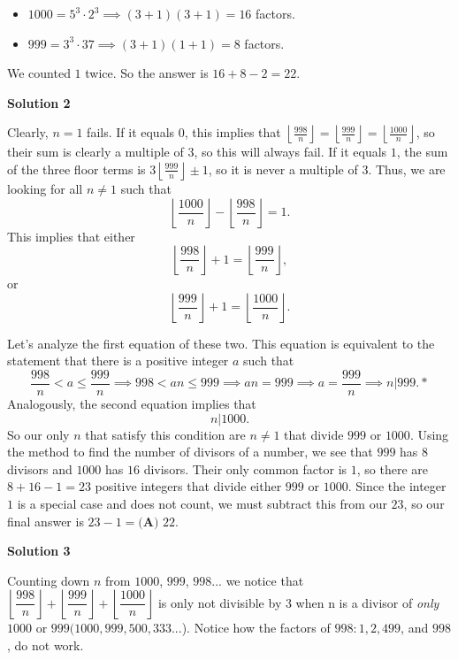 \begin{enumerate}
 
            \begin{itemize}
        \item $1000 = 5^3 \cdot 2^3 \implies (3+1)(3+1) = 16$ factors.
            \end{itemize}
            
            \begin{itemize}
        \item $999 = 3^3 \cdot 37 \implies (3+1)(1+1) = 8$ factors.
            \end{itemize}
            We counted $1$ twice. So the answer is $16 + 8 - 2 = \boxed{22}.$




\textbf{Solution 2}

Clearly, $n=1$ fails. If it equals $0$, this implies that $\left\lfloor \frac{998}{n} \right\rfloor = \left\lfloor \frac{999}{n} \right\rfloor = \left\lfloor \frac{1000}{n} \right\rfloor$, so their sum is clearly a multiple of $3$, so this will always fail. If it equals $1$, the sum of the three floor terms is $3 \left\lfloor \frac{999}{n} \right\rfloor \pm 1$, so it is never a multiple of $3$. Thus, we are looking for all $n \neq 1$ such that
 \[\left\lfloor \frac{1000}{n} \right\rfloor - \left\lfloor \frac{998}{n} \right\rfloor = 1.\]This implies that either
 \[\left\lfloor \frac{998}{n} \right\rfloor + 1 = \left\lfloor \frac{999}{n} \right\rfloor,\]or
 \[\left\lfloor \frac{999}{n} \right\rfloor + 1 = \left\lfloor \frac{1000}{n} \right\rfloor.\]

 Let's analyze the first equation of these two. This equation is equivalent to the statement that there is a positive integer $a$ such that
 \[\frac{998}{n} < a \leq \frac{999}{n} \implies 998 < an \leq 999 \implies an = 999 \implies a = \frac{999}{n} \implies n | 999.*\]Analogously, the second equation implies that
 \[n | 1000.\]So our only $n$ that satisfy this condition are $n \neq 1$ that divide $999$ or $1000$. Using the method to find the number of divisors of a number, we see that $999$ has $8$ divisors and $1000$ has $16$ divisors. Their only common factor is $1$, so there are $8+16-1 = 23$ positive integers that divide either $999$ or $1000$. Since the integer $1$ is a special case and does not count, we must subtract this from our $23$, so our final answer is $23-1 = \boxed{\textbf{(A) } 22}.$




\textbf{Solution 3}

Counting down $n$ from $1000$, $999$, $998$... we notice that $\left\lfloor \dfrac{998}{n} \right\rfloor+\left\lfloor \dfrac{999}{n} \right\rfloor+\left\lfloor \dfrac{1000}{n}\right \rfloor$ is only not divisible by $3$ when n is a divisor of \textit{only} $1000$ or $999 (1000, 999, 500, 333$...). Notice how the factors of $998: 1, 2, 499$, and $998$, do not work. 


\end{enumerate}

